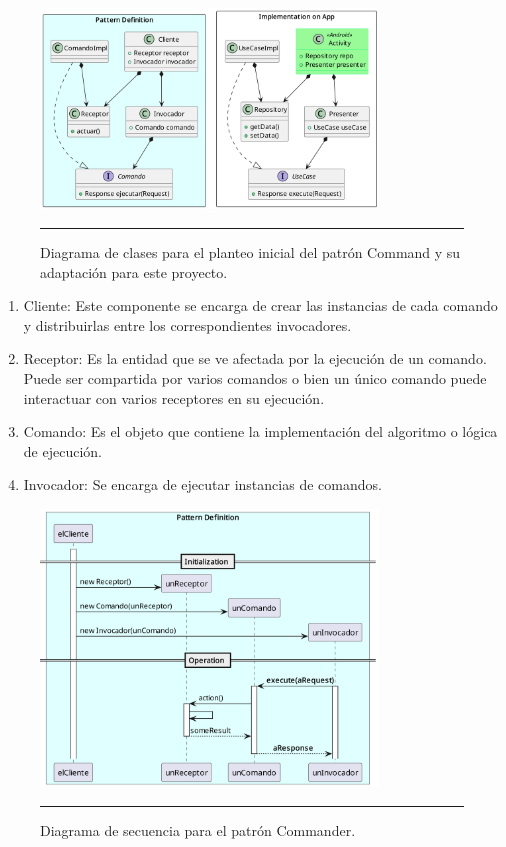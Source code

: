 \begin{figure}[htbp]
	\centering
	\includegraphics[width=0.8\textwidth]{Figures/design/CLASS_command_versus.png}
	\rule{35em}{1pt}
	\caption[Commander Classes]{Diagrama de clases para el planteo inicial del patrón Command y su adaptación para este proyecto.}
	\label{fig:uml_clases_commander}
\end{figure}

\begin{enumerate}
	\item Cliente: Este componente se encarga de crear las instancias de cada comando y distribuirlas entre los correspondientes invocadores.
	\item Receptor: Es la entidad que se ve afectada por la ejecución de un comando. Puede ser compartida por varios comandos o bien un único comando puede interactuar con varios receptores en su ejecución.
	\item Comando: Es el objeto que contiene la implementación del algoritmo o lógica de ejecución.
	\item Invocador: Se encarga de ejecutar instancias de comandos.
\end{enumerate}

\begin{figure}[htbp]
	\centering
	\includegraphics[width=0.8\textwidth]{Figures/design/SEQ_command_def_req_resp.png}
	\rule{35em}{1pt}
	\caption[MVP Components]{Diagrama de secuencia para el patrón Commander.}
	\label{fig:uml_commander_sequence}
\end{figure}

